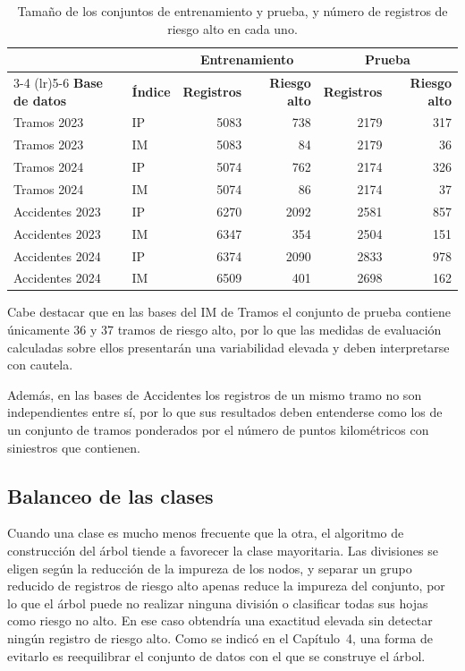 \documentclass[twoside,a4paper,12pt,onecolumn,openany]{book}
\begin{document}
\begin{table}[H]
\centering
\small
\begin{tabular}{llrrrr}
\toprule
 &  & \multicolumn{2}{c}{\textbf{Entrenamiento}} & \multicolumn{2}{c}{\textbf{Prueba}} \\
\cmidrule(lr){3-4} \cmidrule(lr){5-6}
\textbf{Base de datos} & \textbf{Índice} & \textbf{Registros} & \textbf{Riesgo alto} & \textbf{Registros} & \textbf{Riesgo alto} \\
\midrule
Tramos 2023     & IP & 5083 & 738 & 2179 & 317 \\
Tramos 2023     & IM & 5083 & 84  & 2179 & 36  \\
Tramos 2024     & IP & 5074 & 762 & 2174 & 326 \\
Tramos 2024     & IM & 5074 & 86  & 2174 & 37  \\
\midrule
Accidentes 2023 & IP & 6270 & 2092 & 2581 & 857 \\
Accidentes 2023 & IM & 6347 & 354 & 2504 & 151 \\
Accidentes 2024 & IP & 6374 & 2090 & 2833 & 978 \\
Accidentes 2024 & IM & 6509 & 401 & 2698 & 162 \\
\bottomrule
\end{tabular}
\caption{Tamaño de los conjuntos de entrenamiento y prueba, y número de registros de riesgo alto en cada uno.}
\label{tab:particion_arboles}
\end{table}
 
Cabe destacar que en las bases del IM de Tramos el conjunto de prueba contiene únicamente 36 y 37 tramos de riesgo alto, por lo que las medidas de evaluación calculadas sobre ellos presentarán una variabilidad elevada y deben interpretarse con cautela.
 
\vspace{0.5cm}
 
Además, en las bases de Accidentes los registros de un mismo tramo no son independientes entre sí, por lo que sus resultados deben entenderse como los de un conjunto de tramos ponderados por el número de puntos kilométricos con siniestros que contienen.
 
\subsection{Balanceo de las clases}
\label{sec:balanceo}
 
Cuando una clase es mucho menos frecuente que la otra, el algoritmo de construcción del árbol tiende a favorecer la clase mayoritaria. Las divisiones se eligen según la reducción de la impureza de los nodos, y separar un grupo reducido de registros de riesgo alto apenas reduce la impureza del conjunto, por lo que el árbol puede no realizar ninguna división o clasificar todas sus hojas como riesgo no alto. En ese caso obtendría una exactitud elevada sin detectar ningún registro de riesgo alto. Como se indicó en el Capítulo~4, una forma de evitarlo es reequilibrar el conjunto de datos con el que se construye el árbol.
 
\end{document}
